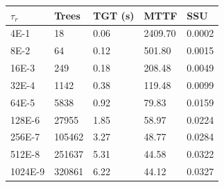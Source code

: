 \documentclass[12pt]{article}
\begin{document}
\begin{center}
	\begin{tabular}{|l|l|l|l|l|}
	\hline
    $\tau_r$      & Trees  & TGT (s) & MTTF    & SSU    \\ \hline
    4E-1	&	18	&	0.06	&	2409.70	&	0.0002	\\ \hline
	8E-2	&	64	&	0.12	&	501.80	&	0.0015	\\ \hline
	16E-3	&	249	&	0.18	&	208.48	&	0.0049	\\ \hline
	32E-4	&	1142	&	0.38	&	119.48	&	0.0099	\\ \hline
	64E-5	&	5838	&	0.92	&	79.83	&	0.0159	\\ \hline
	128E-6	&	27955	&	1.85	&	58.97	&	0.0224	\\ \hline
	256E-7	&	105462	&	3.27	&	48.77	&	0.0284	\\ \hline
	512E-8	&	251637	&	5.31	&	44.58	&	0.0322	\\ \hline
	1024E-9	&	320861	&	6.22	&	44.12	&	0.0327	\\ \hline
    \end{tabular}
\end{center}
\fi 
\end{document}
